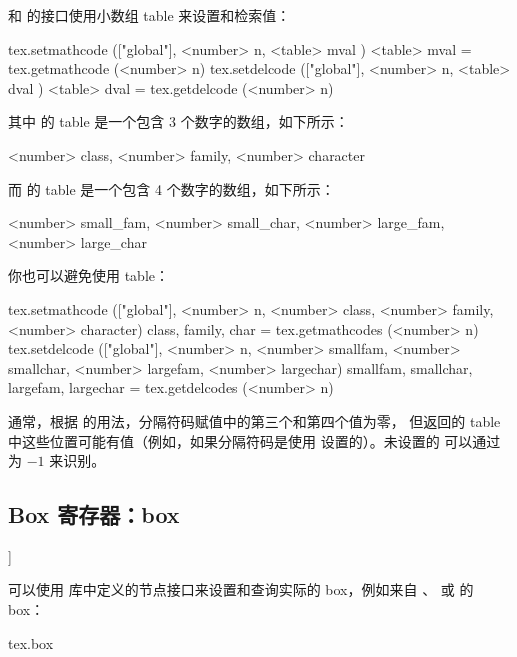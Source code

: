  和  的接口使用小数组 table 来设置和检索值：

\begin{typing}
tex.setmathcode (["global"], <number> n, <table> mval )
<table> mval = tex.getmathcode (<number> n)
tex.setdelcode (["global"], <number> n, <table> dval )
<table> dval = tex.getdelcode (<number> n)
\end{typing}

其中  的 table 是一个包含 3 个数字的数组，如下所示：

\begin{typing}
{
    <number> class,
    <number> family,
    <number> character
}
\end{typing}

而  的 table 是一个包含 4 个数字的数组，如下所示：

\begin{typing}
{
    <number> small_fam,
    <number> small_char,
    <number> large_fam,
    <number> large_char
}
\end{typing}

你也可以避免使用 table：

\begin{typing}
tex.setmathcode (["global"], <number> n, <number> class,
    <number> family, <number> character)
class, family, char =
    tex.getmathcodes (<number> n)
tex.setdelcode (["global"], <number> n, <number> smallfam,
    <number> smallchar, <number> largefam, <number> largechar)
smallfam, smallchar, largefam, largechar =
    tex.getdelcodes (<number> n)
\end{typing}

通常，根据  的用法，分隔符码赋值中的第三个和第四个值为零，
但返回的 table 中这些位置可能有值（例如，如果分隔符码是使用 
设置的）。未设置的  可以通过  为 $-1$ 来识别。

\subsection{{Box 寄存器：\type {[get|set}box}}]


  

可以使用  库中定义的节点接口来设置和查询实际的 box，例如来自
、 或  的 box：

\begin{typing}
tex.box
\end{typing}

